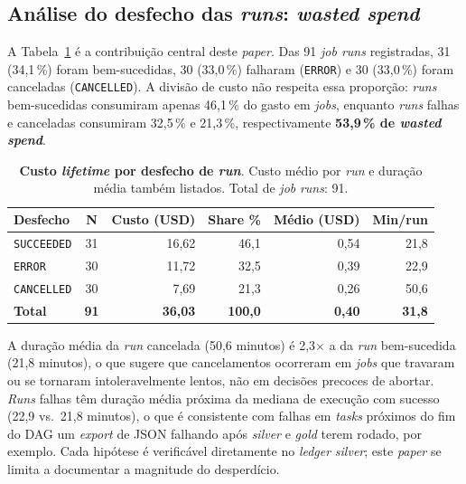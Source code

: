 \documentclass[12pt,a4paper,oneside]{article}
\begin{document}
\subsection{Análise do desfecho das \textit{runs}: \textit{wasted spend}}

A Tabela~\ref{tab:byoutcome} é a contribuição central deste
\textit{paper}. Das 91 \textit{job runs} registradas, 31 (34,1\,\%)
foram bem-sucedidas, 30 (33,0\,\%) falharam (\texttt{ERROR}) e 30
(33,0\,\%) foram canceladas (\texttt{CANCELLED}). A divisão de custo
não respeita essa proporção: \textit{runs} bem-sucedidas
consumiram apenas 46,1\,\% do gasto em \textit{jobs}, enquanto
\textit{runs} falhas e canceladas consumiram 32,5\,\% e 21,3\,\%,
respectivamente \textemdash{} \textbf{53,9\,\% de \textit{wasted
spend}}.

\begin{table}[H]
\centering
\caption{\textbf{Custo \textit{lifetime} por desfecho de \textit{run}}.
        Custo médio por \textit{run} e duração média também listados.
        Total de \textit{job} \textit{runs}: 91.}
\label{tab:byoutcome}
\begin{tabular}{lcrrrr}
\toprule
\textbf{Desfecho}        & \textbf{N} & \textbf{Custo (USD)} & \textbf{Share \%} & \textbf{Médio (USD)} & \textbf{Min/run} \\
\midrule
\texttt{SUCCEEDED}       & 31         & 16,62                & 46,1              & 0,54                 & 21,8 \\
\texttt{ERROR}           & 30         & 11,72                & 32,5              & 0,39                 & 22,9 \\
\texttt{CANCELLED}       & 30         & \phantom{0}7,69      & 21,3              & 0,26                 & 50,6 \\
\midrule
\textbf{Total}           & \textbf{91} & \textbf{36,03}      & \textbf{100,0}    & \textbf{0,40}        & \textbf{31,8} \\
\bottomrule
\end{tabular}
\end{table}

A duração média da \textit{run} cancelada (50,6 minutos) é
2,3$\times$ a da \textit{run} bem-sucedida (21,8 minutos), o que
sugere que cancelamentos ocorreram em \textit{jobs} que travaram
ou se tornaram intoleravelmente lentos, não em decisões precoces
de abortar. \textit{Runs} falhas têm duração média próxima da
mediana de execução com sucesso (22,9 vs.\ 21,8 minutos), o que é
consistente com falhas em \textit{tasks} próximos do fim do DAG
\textemdash{} um \textit{export} de JSON falhando após \textit{silver}
e \textit{gold} terem rodado, por exemplo. Cada hipótese é
verificável diretamente no \textit{ledger} \textit{silver}; este
\textit{paper} se limita a documentar a magnitude do desperdício.
\end{document}
